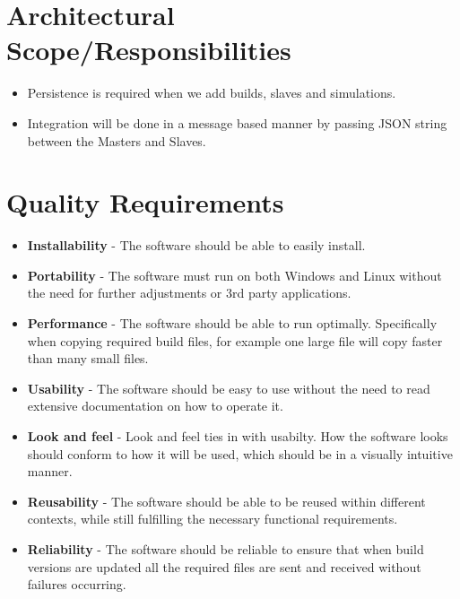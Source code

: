 \documentclass[a4paper,12pt,final]{article}
\begin{document}

\newpage
\section{Architectural Scope/Responsibilities}
\begin{itemize}
\item Persistence is required when we add builds, slaves and simulations.
\item Integration will be done in a message based manner by passing JSON string between the Masters and Slaves.
\end{itemize}


\section{Quality Requirements}
\begin{itemize}
  \item \textbf{Installability} - The software should be able to easily install.
\item \textbf{Portability} - The software must run on both Windows and Linux without the need for further adjustments or 3rd party applications.
\item \textbf{Performance} - The software should be able to run optimally. Specifically when copying required build files, for example one large file will copy faster than many small files.
\item \textbf{Usability} - The software should be easy to use without the need to read extensive documentation on how to operate it.
\item \textbf{Look and feel} - Look and feel ties in with usabilty. How the software looks should conform to how it will be used, which should be in a visually intuitive manner.
\item \textbf{Reusability} - The software should be able to be reused within different contexts, while still fulfilling the necessary functional requirements.
\item \textbf{Reliability} - The software should be reliable to ensure that when build versions are updated all the required files are sent and received without failures occurring.
\end{itemize}
\end{document}
